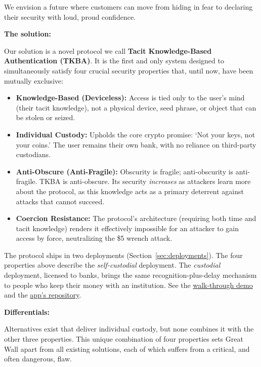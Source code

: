 We envision a future where customers can move from hiding in fear to declaring their security with loud, proud confidence.

\textbf{The solution:} \par
Our solution is a novel protocol we call \textbf{Tacit Knowledge-Based Authentication (TKBA)}. It is the first and only system designed to simultaneously satisfy four crucial security properties that, until now, have been mutually exclusive:

\begin{itemize}
    \item \textbf{Knowledge-Based (Deviceless):} Access is tied only to the user's mind (their tacit knowledge), not a physical device, seed phrase, or object that can be stolen or seized.
    \item \textbf{Individual Custody:} Upholds the core crypto promise: `Not your keys, not your coins.' The user remains their own bank, with no reliance on third-party custodians.
    \item \textbf{Anti-Obscure (Anti-Fragile):} Obscurity is fragile; anti-obscurity is anti-fragile. TKBA is anti-obscure. Its security \textit{increases} as attackers learn more about the protocol, as this knowledge acts as a primary deterrent against attacks that cannot succeed.
    \item \textbf{Coercion Resistance:} The protocol's architecture (requiring both time and tacit knowledge) renders it effectively impossible for an attacker to gain access by force, neutralizing the \$5 wrench attack.
\end{itemize}

The protocol ships in two deployments (Section~\ref{sec:deployments}). The four properties above describe the \emph{self-custodial} deployment. The \emph{custodial} deployment, licensed to banks, brings the same recognition-plus-delay mechanism to people who keep their money with an institution. See the \href{\demourl}{walk-through demo} and the \href{\appurl}{app's repository}.

\textbf{Differentials:} \par
Alternatives exist that deliver individual custody, but none combines it with the other three properties. This unique combination of four properties sets Great Wall apart from all existing solutions, each of which suffers from a critical, and often dangerous, flaw.

